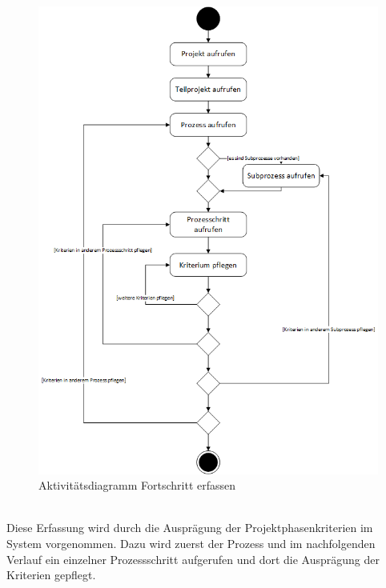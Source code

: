 \begin{figure}[h!]
    \centering
    \includegraphics[scale=0.67]{./Bilder/AD5_FortschrittErfassen.png}
    \caption[Aktivitätsdiagramm Anwendungsfall 5]{Aktivitätsdiagramm Fortschritt erfassen}
    \label{fig:AD5}
\end{figure}
\\Diese Erfassung wird durch die Ausprägung der Projektphasenkriterien im System vorgenommen. Dazu wird zuerst der Prozess und im nachfolgenden Verlauf ein einzelner Prozessschritt aufgerufen und dort die Ausprägung der Kriterien gepflegt.
\newpage

